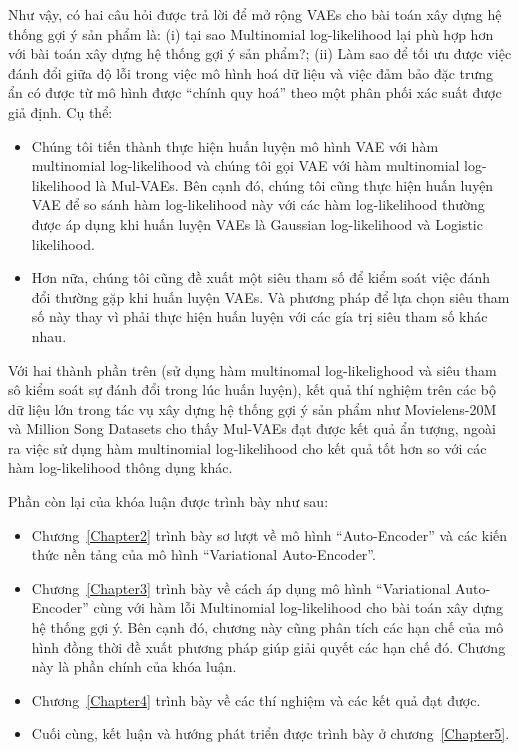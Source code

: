 Như vậy, có hai câu hỏi được trả lời để mở rộng VAEs cho bài toán xây dựng hệ thống gợi ý sản phẩm là: (i) tại sao Multinomial log-likelihood lại phù hợp hơn với bài toán xây dựng hệ thống gợi ý sản phẩm?; (ii) Làm sao để tối ưu được việc đánh đổi giữa độ lỗi trong việc mô hình hoá dữ liệu và việc đảm bảo đặc trưng ẩn có được từ mô hình được ``chính quy hoá'' theo một phân phối xác suất được giả định. Cụ thể:
\begin{itemize}
    \item Chúng tôi tiến thành thực hiện huấn luyện mô hình VAE với hàm multinomial log-likelihood và chúng tôi gọi VAE với hàm multinomial log-likelihood là Mul-VAEs. Bên cạnh đó, chúng tôi cũng thực hiện huấn luyện VAE để so sánh hàm log-likelihood này với các hàm log-likelihood thường được áp dụng khi huấn luyện VAEs là Gaussian log-likelihood và Logistic likelihood.
    \item Hơn nữa, chúng tôi cũng đề xuất một siêu tham số để kiểm soát việc đánh đổi thường gặp khi huấn luyện VAEs. Và phương pháp để lựa chọn siêu tham số này thay vì phải thực hiện huấn luyện với các gía trị siêu tham số khác nhau.
\end{itemize}

Với hai thành phần trên (sử dụng hàm multinomal log-likelighood và siêu tham sô kiểm soát sự đánh đổi trong lúc huấn luyện), kết quả thí nghiệm trên các bộ dữ liệu lớn trong tác vụ xây dựng hệ thống gợi ý sản phẩm như Movielens-20M và Million Song Datasets cho thấy Mul-VAEs đạt được kết quả ẩn tượng, ngoài ra việc sử dụng hàm multinomial log-likelihood cho kết quả tốt hơn so với các hàm log-likelihood thông dụng khác.

Phần còn lại của khóa luận được trình bày như sau:
\begin{itemize}
    \item Chương~\ref{Chapter2} trình bày sơ lượt về mô hình ``Auto-Encoder'' và các kiến thức nền tảng của mô hình ``Variational Auto-Encoder''.
    \item Chương~\ref{Chapter3} trình bày về cách áp dụng mô hình ``Variational Auto-Encoder'' cùng với hàm lỗi Multinomial log-likelihood cho bài toán xây dựng hệ thống gợi ý. Bên cạnh đó, chương này cũng phân tích các hạn chế của mô hình đồng thời đề xuất phương pháp giúp giải quyết các hạn chế đó. Chương này là phần chính của khóa luận.
    \item Chương~\ref{Chapter4} trình bày về các thí nghiệm và các kết quả đạt được.
    \item Cuối cùng, kết luận và hướng phát triển được trình bày ở chương~\ref{Chapter5}.
\end{itemize}

